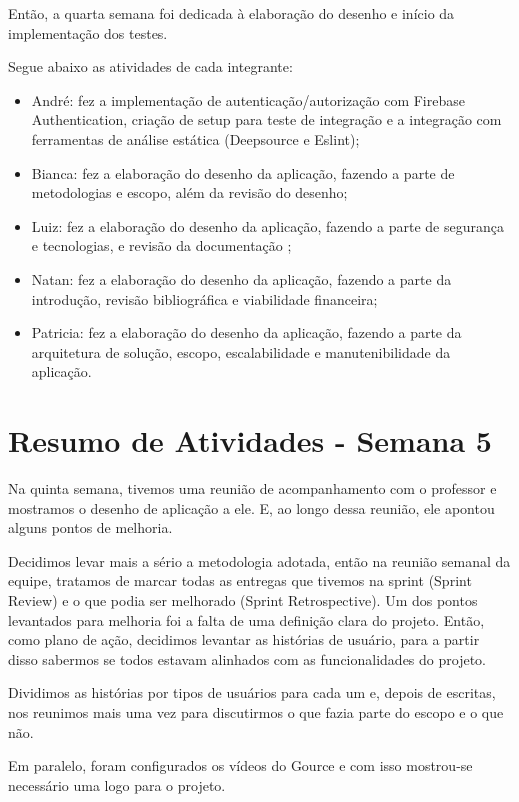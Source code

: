 \begin{apendicesenv}
Então, a quarta semana foi dedicada à elaboração do desenho e início da implementação dos testes. 

Segue abaixo as atividades de cada integrante:

\begin{itemize}
\item André: fez a implementação de autenticação/autorização com Firebase Authentication, criação de \gls{setup} para teste de integração e a integração com ferramentas de análise estática (Deepsource e Eslint);
\item Bianca: fez a elaboração do desenho da aplicação, fazendo a parte de metodologias e escopo, além da revisão do desenho;
\item Luiz: fez a elaboração do desenho da aplicação, fazendo a parte de segurança e tecnologias, e revisão da documentação ;
\item Natan: fez a elaboração do desenho da aplicação, fazendo a parte da introdução, revisão bibliográfica e viabilidade financeira;
\item Patricia: fez a elaboração do desenho da aplicação, fazendo a parte da arquitetura de solução, escopo, escalabilidade e manutenibilidade da aplicação.
\end{itemize}

\section{Resumo de Atividades - Semana 5}
Na quinta semana, tivemos uma reunião de acompanhamento com o professor e mostramos o desenho de aplicação a ele. E, ao longo dessa reunião, ele apontou alguns pontos de melhoria.

Decidimos levar mais a sério a metodologia adotada, então na reunião semanal da equipe, tratamos de marcar todas as entregas que tivemos na \gls{sprint} (Sprint Review) e o que podia ser melhorado (Sprint Retrospective). Um dos pontos levantados para melhoria foi a falta de uma definição clara do projeto. Então, como plano de ação, decidimos levantar as histórias de usuário, para a partir disso sabermos se todos estavam alinhados com as funcionalidades do projeto. 

Dividimos as histórias por tipos de usuários para cada um e, depois de escritas, nos reunimos mais uma vez para discutirmos o que fazia parte do escopo e o que não.

Em paralelo, foram configurados os vídeos do Gource e com isso mostrou-se necessário uma logo para o projeto.


\end{apendicesenv}
